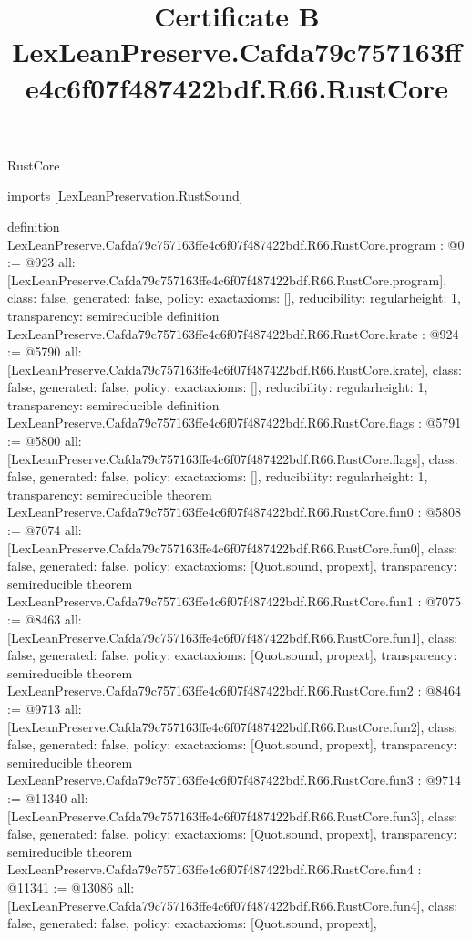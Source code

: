 \begin{lexlean}{RustCore}
\title{Certificate B LexLeanPreserve.Cafda79c757163ffe4c6f07f487422bdf.R66.RustCore}
\begin{coremodule}
imports [LexLeanPreservation.RustSound]

definition LexLeanPreserve.Cafda79c757163ffe4c6f07f487422bdf.R66.RustCore.program : @0 := @923 {
  all: [LexLeanPreserve.Cafda79c757163ffe4c6f07f487422bdf.R66.RustCore.program],
  class: false,
  generated: false,
  policy: exact{axioms: []},
  reducibility: regular{height: 1},
  transparency: semireducible
}
definition LexLeanPreserve.Cafda79c757163ffe4c6f07f487422bdf.R66.RustCore.krate : @924 := @5790 {
  all: [LexLeanPreserve.Cafda79c757163ffe4c6f07f487422bdf.R66.RustCore.krate],
  class: false,
  generated: false,
  policy: exact{axioms: []},
  reducibility: regular{height: 1},
  transparency: semireducible
}
definition LexLeanPreserve.Cafda79c757163ffe4c6f07f487422bdf.R66.RustCore.flags : @5791 := @5800 {
  all: [LexLeanPreserve.Cafda79c757163ffe4c6f07f487422bdf.R66.RustCore.flags],
  class: false,
  generated: false,
  policy: exact{axioms: []},
  reducibility: regular{height: 1},
  transparency: semireducible
}
theorem LexLeanPreserve.Cafda79c757163ffe4c6f07f487422bdf.R66.RustCore.fun0 : @5808 := @7074 {
  all: [LexLeanPreserve.Cafda79c757163ffe4c6f07f487422bdf.R66.RustCore.fun0],
  class: false,
  generated: false,
  policy: exact{axioms: [Quot.sound, propext]},
  transparency: semireducible
}
theorem LexLeanPreserve.Cafda79c757163ffe4c6f07f487422bdf.R66.RustCore.fun1 : @7075 := @8463 {
  all: [LexLeanPreserve.Cafda79c757163ffe4c6f07f487422bdf.R66.RustCore.fun1],
  class: false,
  generated: false,
  policy: exact{axioms: [Quot.sound, propext]},
  transparency: semireducible
}
theorem LexLeanPreserve.Cafda79c757163ffe4c6f07f487422bdf.R66.RustCore.fun2 : @8464 := @9713 {
  all: [LexLeanPreserve.Cafda79c757163ffe4c6f07f487422bdf.R66.RustCore.fun2],
  class: false,
  generated: false,
  policy: exact{axioms: [Quot.sound, propext]},
  transparency: semireducible
}
theorem LexLeanPreserve.Cafda79c757163ffe4c6f07f487422bdf.R66.RustCore.fun3 : @9714 := @11340 {
  all: [LexLeanPreserve.Cafda79c757163ffe4c6f07f487422bdf.R66.RustCore.fun3],
  class: false,
  generated: false,
  policy: exact{axioms: [Quot.sound, propext]},
  transparency: semireducible
}
theorem LexLeanPreserve.Cafda79c757163ffe4c6f07f487422bdf.R66.RustCore.fun4 : @11341 := @13086 {
  all: [LexLeanPreserve.Cafda79c757163ffe4c6f07f487422bdf.R66.RustCore.fun4],
  class: false,
  generated: false,
  policy: exact{axioms: [Quot.sound, propext]},
}
\end{coremodule}
\end{lexlean}
